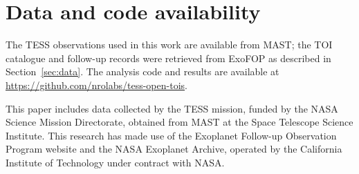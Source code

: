 \documentclass{aastex701}
\begin{document}
\section*{Data and code availability}
The TESS observations used in this work are available from MAST; the TOI catalogue and follow-up
records were retrieved from ExoFOP as described in Section~\ref{sec:data}.
The analysis code and results are available at
\url{https://github.com/nrolabs/tess-open-tois}.

\begin{acknowledgments}
This paper includes data collected by the TESS mission, funded by the NASA Science Mission
Directorate, obtained from MAST at the Space Telescope Science Institute. This research has made use
of the Exoplanet Follow-up Observation Program website and the NASA Exoplanet Archive, operated by
the California Institute of Technology under contract with NASA.
\end{acknowledgments}





\end{document}
